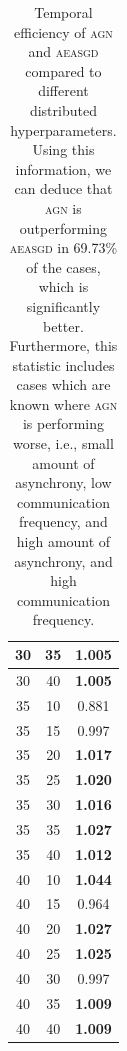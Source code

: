 \begin{table}
\begin{tabular}{|c|c|c|}
\hline
30 & 35 & \textbf{1.005} \\
\hline
30 & 40 & \textbf{1.005} \\
\hline
35 & 10 & 0.881 \\
\hline
35 & 15 & 0.997 \\
\hline
35 & 20 & \textbf{1.017} \\
\hline
35 & 25 & \textbf{1.020} \\
\hline
35 & 30 & \textbf{1.016} \\
\hline
35 & 35 & \textbf{1.027} \\
\hline
35 & 40 & \textbf{1.012} \\
\hline
40 & 10 & \textbf{1.044} \\
\hline
40 & 15 & 0.964 \\
\hline
40 & 20 & \textbf{1.027} \\
\hline
40 & 25 & \textbf{1.025} \\
\hline
40 & 30 & 0.997 \\
\hline
40 & 35 & \textbf{1.009} \\
\hline
40 & 40 & \textbf{1.009} \\
\hline
  \end{tabular}
  \caption{Temporal efficiency of \textsc{agn} and \textsc{aeasgd} compared to different distributed hyperparameters. Using this information, we can deduce that \textsc{agn} is outperforming \textsc{aeasgd} in 69.73\% of the cases, which is significantly better. Furthermore, this statistic includes cases which are known where \textsc{agn} is performing worse, i.e., small amount of asynchrony, low communication frequency, and high amount of asynchrony, and high communication frequency.}
  \label{table:agn_temporal_efficiency}
\end{table}

